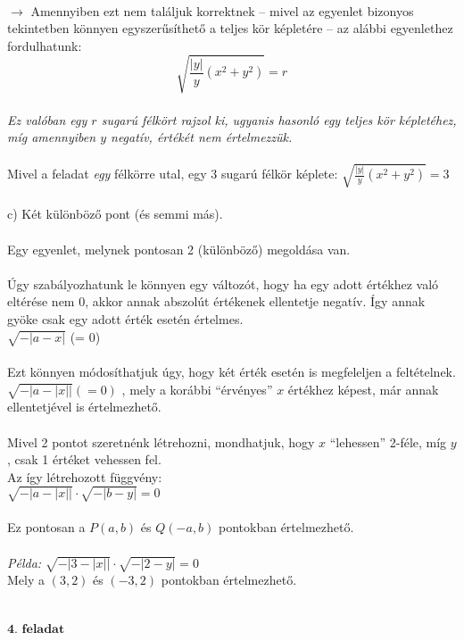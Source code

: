 \documentclass[a4paper,12pt]{article}
\begin{document}
\\ \indent \indent $\rightarrow$ Amennyiben ezt nem találjuk korrektnek -- mivel az egyenlet bizonyos tekintetben könnyen egyszerűsíthető a teljes kör képletére -- az alábbi egyenlethez fordulhatunk:
\\ $$\sqrt{\frac{|y|}{y}(x^2 + y^2)} = r$$
\\ \textit{Ez valóban egy $r$ sugarú félkört rajzol ki, ugyanis hasonló egy teljes kör képletéhez, míg amennyiben $y$ negatív, értékét nem értelmezzük.}
\\
\\ Mivel a feladat \textit{egy} félkörre utal, egy $3$ sugarú félkör képlete: $\sqrt{\frac{|y|}{y}(x^2 + y^2)} = 3$
\\
\\ c) Két különböző pont (és semmi más).
\\
\\ Egy egyenlet, melynek pontosan 2 (különböző) megoldása van.
\\
\\ Úgy szabályozhatunk le könnyen egy változót, hogy ha egy adott értékhez való eltérése nem $0$, akkor annak abszolút értékenek ellentetje negatív. Így annak gyöke csak egy adott érték esetén értelmes.
\\ $\sqrt{-|a-x|}$ (= 0)
\\
\\ Ezt könnyen módosíthatjuk úgy, hogy két érték esetén is megfeleljen a feltételnek.
\\ $\sqrt{-|a-|x||} (= 0)$ , mely a korábbi ``érvényes'' $x$ értékhez képest, már annak ellentetjével is értelmezhető.
\\
\\ Mivel 2 pontot szeretnénk létrehozni, mondhatjuk, hogy $x$ ``lehessen'' 2-féle, míg $y$, csak 1 értéket vehessen fel.
\\ Az így létrehozott függvény:
\\ \indent $\sqrt{-|a-|x||} \cdot \sqrt{-|b-y|} = 0$
\\ 
\\ \indent Ez pontosan a $P(a, b)$ és $Q(-a, b)$ pontokban értelmezhető.
\\
\\ \textit{Példa:} $\sqrt{-|3-|x||} \cdot \sqrt{-|2-y|} = 0$
\\ \indent Mely a $(3, 2)$ és $(-3, 2)$ pontokban értelmezhető.
\\
\\
\\
\underline{\textit{$\textbf{4. feladat} $}}
\end{document}
